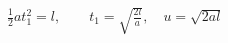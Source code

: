 \documentclass[border=2.5pt]{standalone}
\begin{document}
$\displaystyle \tfrac12at_1^2=l,\qquad t_1=\sqrt{\frac{2l}{a}},\quad u=\sqrt{2al}$
\end{document}
